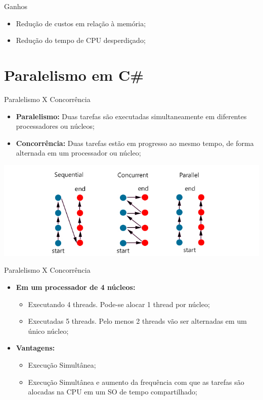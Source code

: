 \documentclass[10pt]{beamer}
\begin{document}
\begin{frame}{Ganhos}
	\begin{itemize}
		\item Redução de custos em relação à memória;
		\vspace{0.2cm}
		\item Redução do tempo de CPU desperdiçado;
	\end{itemize}
\end{frame}

\section{Paralelismo em C\#}

\begin{frame}{Paralelismo X Concorrência}
	\begin{itemize}
		\item \textbf{Paralelismo:} Duas tarefas são executadas simultaneamente em diferentes processadores ou núcleos;
		\vspace{0.2cm}
		\item \textbf{Concorrência:} Duas tarefas estão em progresso ao mesmo tempo, de forma alternada em um processador ou núcleo;
	\end{itemize}
	\includegraphics[width=\textwidth]{imgs/compare}
\end{frame}

\begin{frame}{Paralelismo X Concorrência}
	\begin{itemize}
		\item \textbf{Em um processador de 4 núcleos:}
		\begin{itemize}
			\item Executando 4 threads. Pode-se alocar 1 thread por núcleo;
			\vspace{0.2cm}
			\item Executadas 5 threads. Pelo menos 2 threads vão ser alternadas em um único núcleo;
		\end{itemize}
	\end{itemize}
	\begin{itemize}
		\item \textbf{Vantagens:}
		\begin{itemize}
			\item Execução Simultânea;
			\vspace{0.2cm}
			\item Execução Simultânea e aumento da frequência com que as tarefas são alocadas na CPU em um SO de tempo compartilhado;
		\end{itemize}
	\end{itemize}
\end{frame}
\end{document}
